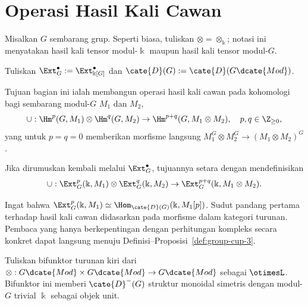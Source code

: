 
\section{Operasi Hasil Kali Cawan}\label{sec:cup-product}
\hypertarget{o014.aljabr2.chapter6.cup-product}{ }

Misalkan $G$ sembarang grup. Seperti biasa, tuliskan
$\otimes=\otimes_{\Bbbk}$; notasi ini menyatakan hasil kali tensor
modul-$\Bbbk$ maupun hasil kali tensor modul-$G$.

\begin{konvensi}
	Tuliskan $\Ext_G^\bullet:=\Ext_{\Bbbk[G]}^\bullet$ dan
	$\cate{D}(G):=\cate{D}(G\dcate{Mod})$.
\end{konvensi}

Tujuan bagian ini ialah membangun operasi hasil kali cawan pada kohomologi bagi
sembarang modul-$G$ $M_1$ dan $M_2$,
\[ \cup: \Hm^p(G, M_1) \otimes \Hm^q(G, M_2) \to \Hm^{p+q}(G, M_1 \otimes M_2), \quad p, q \in \Z_{\geq 0}, \]
yang untuk $p=q=0$ memberikan morfisme langsung
$M_1^G\otimes M_2^G\to(M_1\otimes M_2)^G$.

Jika dirumuskan kembali melalui $\Ext_G^\bullet$, tujuannya setara dengan
mendefinisikan
\[ \cup: \Ext^p_G(\Bbbk, M_1) \otimes \Ext^q_G(\Bbbk, M_2) \to \Ext_G^{p+q}(\Bbbk, M_1 \otimes M_2). \]

Ingat bahwa
$\Ext^p_G(\Bbbk,M_1)\simeq\Hom_{\cate{D}(G)}(\Bbbk,M_1[p])$. Sudut pandang
pertama terhadap hasil kali cawan didasarkan pada morfisme dalam kategori
turunan. Pembaca yang hanya berkepentingan dengan perhitungan kompleks secara
konkret dapat langsung menuju Definisi--Proposisi~\ref{def:group-cup-3}.

\begin{definisi}
	Tuliskan bifunktor turunan kiri dari
	$\otimes:G\dcate{Mod}\times G\dcate{Mod}\to G\dcate{Mod}$ sebagai
	$\otimesL$. Bifunktor ini memberi $\cate{D}^-(G)$ struktur monoidal simetris
	dengan modul-$G$ trivial $\Bbbk$ sebagai objek unit.
\end{definisi}

